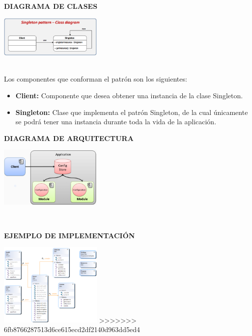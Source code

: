 \documentclass[twoside,twocolumn]{article}
\begin{document}
	\item \textbf{DIAGRAMA DE CLASES}
    \begin{center}
        \includegraphics[width=5cm]{./img/imagen2.png} 
    \end{center}
    \\
    Los componentes que conforman el patrón son los siguientes: 
	\begin{itemize}
		\item \textbf{Client:} Componente que desea obtener una instancia de la clase Singleton. 
		\item \textbf{Singleton:} Clase que implementa el patrón Singleton, de la cual únicamente se podrá tener una instancia durante toda la vida de la aplicación. 
    \end{itemize}
    \item \textbf{DIAGRAMA DE ARQUITECTURA}
    \begin{center}
        \includegraphics[width=5cm]{./img/imagen3.png} 
    \end{center}
    \\
    \item \textbf{EJEMPLO DE IMPLEMENTACIÓN}
    \begin{center}
        \includegraphics[width=5cm]{./img/imagen4.png} 
>>>>>>> 6fb8766287513d6ce615ecd2df2140d963dd5ed4
    \end{center}
	
\end{document}
